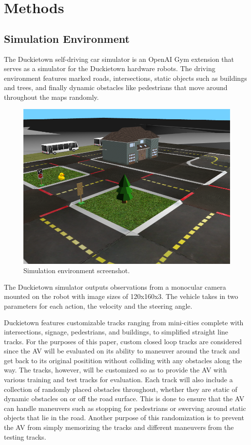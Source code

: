 \documentclass[conference]{IEEEtran}
\begin{document}
\section{Methods}

\subsection{Simulation Environment}
The Duckietown self-driving car simulator is an OpenAI Gym extension that serves as a 
simulator for the Duckietown hardware robots. The driving environment features marked roads, 
intersections, static objects such as buildings and trees, and finally dynamic obstacles 
like pedestrians that move around throughout the maps randomly. \par
\begin{figure}[H]
  \centering
    \includegraphics[scale=0.25]{simplesim_free.png}
  \caption{Simulation environment screenshot.}
\end{figure}
The Duckietown simulator outputs observations from a monocular camera mounted on the robot
with image sizes of 120x160x3. The vehicle takes in two parameters for each action, the velocity
and the steering angle.  \par 
Duckietown features customizable tracks ranging from mini-cities complete with intersections, signage,
pedestrians, and buildings, to simplified straight line tracks. For the purposes of this paper,
custom closed loop tracks are considered since the AV will be evaluated on its ability to maneuver 
around the track and get back to its original positition without colliding with any obstacles along 
the way. The tracks, however, will be customized so as to provide the AV with various training and 
test tracks for evaluation. Each track will also include a collection of randomly placed obstacles 
throughout, whether they are static of dynamic obstacles on or off the road surface. This is done 
to ensure that the AV can handle maneuvers such as stopping for pedestrians or swerving around static 
objects that lie in the road. Another purpose of this randomization is to prevent the AV from simply
memorizing the tracks and different maneuvers from the testing tracks. 
\end{document}
